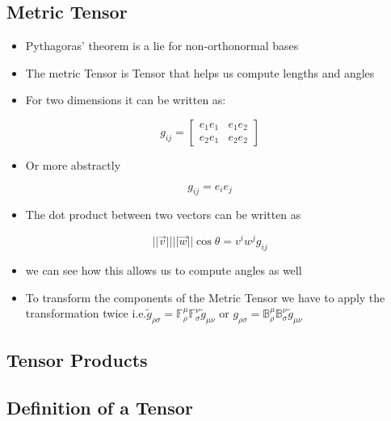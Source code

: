\subsection{Metric Tensor}
\begin{itemize}
	\item Pythagoras' theorem is a lie for non-orthonormal bases
	\item The metric Tensor is Tensor that helps us compute lengths and angles
	\item For two dimensions it can be written as:
\end{itemize}
$$\textit{g}_{ij} = \begin{bmatrix}
	e_{1}e_{1} & e_{1}e_{2} \\
	e_{2}e_{1} & e_{2}e_{2} 
\end{bmatrix}$$
\begin{itemize}
	\item Or more abstractly
\end{itemize}
$$\textit{g}_{ij} = e_{i}e_{j}$$
\begin{itemize}
	\item The dot product between two vectors can be written as
\end{itemize}
$$||\vec{v}|| ||\vec{w}||\cos{\theta} = v^{i}w^{j}\textit{g}_{ij}$$
\begin{itemize}
	\item we can see how this allows us to compute angles as well
	\item To transform the components of the Metric Tensor we have to apply the transformation twice i.e.$\tilde{g}_{\rho \sigma} = \mathbb{F}^{\mu}_{\rho} \mathbb{F}^{\nu}_{\sigma}\tilde{g}_{\mu \nu}$ or $g_{\rho \sigma} = \mathbb{B}^{\mu}_{\rho} \mathbb{B}^{\nu}_{\sigma}\tilde{g}_{\mu \nu}$
\end{itemize}

\subsection{Tensor Products}

\subsection{Definition of a Tensor}
